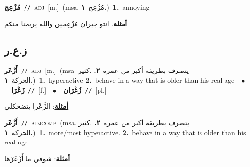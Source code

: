 \documentclass[10pt,a4paper,twoside]{article} %
\begin{document}
\begin{multicols}{2}
{\setlength\topsep{0pt}\textbf{\foreignlanguage{arabic}{مُزْعِج}}\ {\color{gray}\texttt{//}\color{black}}\ \textsc{adj}\ [m.]\ \color{gray}(msa. \foreignlanguage{arabic}{مُزْعِج}~\foreignlanguage{arabic}{\textbf{١.}})\color{black}\ \textbf{1.}~annoying\  \begin{flushright}\color{gray}\foreignlanguage{arabic}{\textbf{\underline{\foreignlanguage{arabic}{أمثلة}}}: انتو جيران مُزْعِجين والله يريحنا منكم}\end{flushright}\color{black}} \vspace{2mm}

\vspace{-3mm}
\subsection*{\color{blue}\foreignlanguage{arabic}{ز.ع.ر}\color{blue}{}} 

{\setlength\topsep{0pt}\textbf{\foreignlanguage{arabic}{أَزْعَر}}\ {\color{gray}\texttt{//}\color{black}}\ \textsc{adj}\ [m.]\ \color{gray}(msa. \foreignlanguage{arabic}{يتصرف بطريقة أكبر من عمره}~\foreignlanguage{arabic}{\textbf{٢.}}  .\foreignlanguage{arabic}{كثير الحركة}~\foreignlanguage{arabic}{\textbf{١.}})\color{black}\ \textbf{1.}~hyperactive  \textbf{2.}~behave in a way that is older than his real age\ \ $\bullet$\ \ \setlength\topsep{0pt}\textbf{\foreignlanguage{arabic}{زَعْرَا}}\ {\color{gray}\texttt{//}\color{black}}\ [f.]\ \ $\bullet$\ \ \setlength\topsep{0pt}\textbf{\foreignlanguage{arabic}{زُعْرَان}}\ {\color{gray}\texttt{//}\color{black}}\ [pl.]\  \begin{flushright}\color{gray}\foreignlanguage{arabic}{\textbf{\underline{\foreignlanguage{arabic}{أمثلة}}}: الزَّعْرا يتضحكلي}\end{flushright}\color{black}} \vspace{2mm}

{\setlength\topsep{0pt}\textbf{\foreignlanguage{arabic}{أَزْعَر}}\ {\color{gray}\texttt{//}\color{black}}\ \textsc{adj\textunderscore comp}\ \color{gray}(msa. \foreignlanguage{arabic}{يتصرف بطريقة أكبر من عمره}~\foreignlanguage{arabic}{\textbf{٢.}}  .\foreignlanguage{arabic}{كثير الحركة}~\foreignlanguage{arabic}{\textbf{١.}})\color{black}\ \textbf{1.}~more/most hyperactive.  \textbf{2.}~behave in a way that is older than his real age\  \begin{flushright}\color{gray}\foreignlanguage{arabic}{\textbf{\underline{\foreignlanguage{arabic}{أمثلة}}}: شوفي ما أَزْعَرْها}\end{flushright}\color{black}} \vspace{2mm}


\end{multicols}
\end{document}
